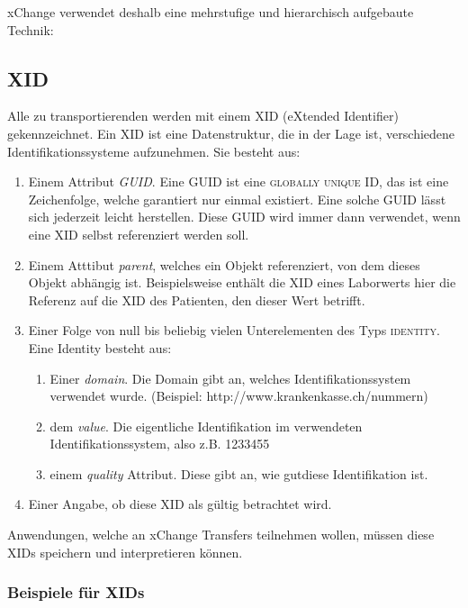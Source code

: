 \documentclass[a4paper]{scrartcl}
\begin{document}
 xChange verwendet deshalb eine mehrstufige und hierarchisch aufgebaute Technik:

\subsection{XID}
   Alle zu transportierenden werden mit einem XID (eXtended Identifier) gekennzeichnet. Ein XID ist eine Datenstruktur, die in der Lage ist, verschiedene Identifikationssysteme aufzunehmen. Sie besteht aus:
 \begin{enumerate}
      \item Einem Attribut \textit{GUID}. Eine GUID ist eine \textsc{globally unique ID}, das ist eine Zeichenfolge, welche garantiert nur einmal existiert. Eine solche GUID lässt sich jederzeit leicht herstellen. Diese GUID wird immer dann verwendet, wenn eine XID selbst referenziert werden soll.
      \item Einem Atttibut \textit{parent}, welches ein Objekt referenziert, von dem dieses Objekt abhängig ist. Beispielsweise enthält die XID eines Laborwerts hier die Referenz auf die XID des Patienten, den dieser Wert betrifft.
      \item Einer Folge von null bis beliebig vielen Unterelementen des Typs \textsc{identity}. Eine Identity besteht aus:
          \begin{enumerate}
            \item Einer \textit{domain}. Die Domain gibt an, welches Identifikationssystem verwendet wurde. (Beispiel: http://www.krankenkasse.ch/nummern)
            \item dem \textit{value}. Die eigentliche Identifikation im verwendeten Identifikationssystem, also z.B. 1233455
            \item einem \textit{quality} Attribut. Diese gibt an, wie \glqq gut\grqq diese Identifikation ist.
          \end{enumerate}
      \item Einer Angabe, ob diese XID als gültig betrachtet wird.
   \end{enumerate}

Anwendungen, welche an xChange Transfers teilnehmen wollen, müssen diese XIDs speichern und interpretieren können.

\subsubsection{Beispiele für XIDs}
\end{document}
